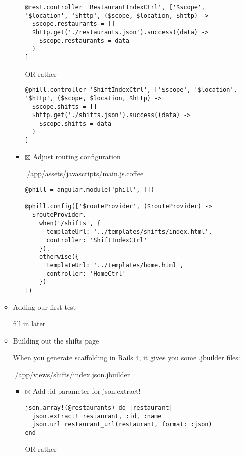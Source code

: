 \documentclass[11pt]{article}
\begin{document}
\begin{itemize}
\begin{itemize}
\begin{itemize}
\begin{verbatim}
@rest.controller 'RestaurantIndexCtrl', ['$scope', '$location', '$http', ($scope, $location, $http) ->
  $scope.restaurants = []
  $http.get('./restaurants.json').success((data) ->
    $scope.restaurants = data
  )
]
\end{verbatim}

OR rather

\begin{verbatim}
@phill.controller 'ShiftIndexCtrl', ['$scope', '$location', '$http', ($scope, $location, $http) ->
  $scope.shifts = []
  $http.get('./shifts.json').success((data) ->
    $scope.shifts = data
  )
]
\end{verbatim}

\item $\boxtimes$ Adjust routing configuration

\url{./app/assets/javascripts/main.js.coffee}

\begin{verbatim}
@phill = angular.module('phill', [])

@phill.config(['$routeProvider', ($routeProvider) ->
  $routeProvider.
    when('/shifts', {
      templateUrl: '../templates/shifts/index.html',
      controller: 'ShiftIndexCtrl'
    }).
    otherwise({
      templateUrl: '../templates/home.html',
      controller: 'HomeCtrl'
    })
])
\end{verbatim}
\end{itemize}

\item Adding our first test
\label{sec-1-3-3-1-0-5}

fill in later

\item Building out the shifts page
\label{sec-1-3-3-1-0-6}

When you generate scaffolding in Rails 4, it gives you some .jbuilder files:

\url{./app/views/shifts/index.json.jbuilder}

\begin{itemize}
\item $\boxtimes$ Add :id parameter for json.extract!

\begin{verbatim}
json.array!(@restaurants) do |restaurant|
  json.extract! restaurant, :id, :name
  json.url restaurant_url(restaurant, format: :json)
end
\end{verbatim}

OR rather


\end{itemize}
\end{itemize}
\end{itemize}
\end{document}
